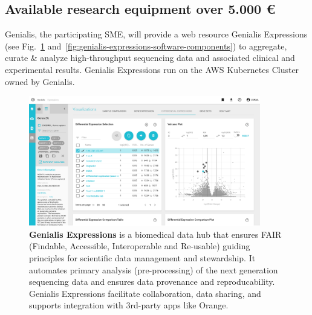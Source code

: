 \documentclass[11pt,a4paper]{article}
\renewcommand{\bold}{\textbf}
\begin{document}
\subsection{Available research equipment over 5.000 €}

Genialis, the participating SME, will provide a web resource Genialis Expressions (see Fig.~\ref{fig:genialis-expressions-frontend} and~\ref{fig:genialis-expressions-software-components}) to aggregate, curate & analyze high-throughput sequencing data and associated clinical and experimental results. Genialis Expressions run on the AWS Kubernetes Cluster owned by Genialis.

\begin{figure}
\includegraphics[width=0.90\textwidth]{genialis-expressions-frontend}
\caption{\bold{Genialis Expressions} is a biomedical data hub that ensures FAIR (Findable, Accessible, Interoperable and Re-usable) guiding principles for scientific data management and stewardship. It automates primary analysis (pre-processing) of the next generation sequencing data and ensures data provenance and reproducability. Genialis Expressions facilitate collaboration, data sharing, and supports integration with 3rd-party apps like Orange.}
\label{fig:genialis-expressions-frontend}
\end{figure}
\end{document}
